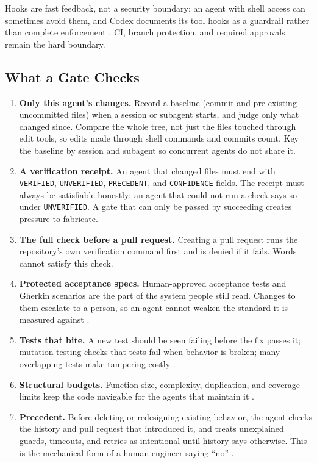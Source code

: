 \documentclass[11pt]{article}
\begin{document}
Hooks are fast feedback, not a security boundary: an agent with shell access can sometimes avoid them, and Codex documents its tool hooks as a guardrail rather than complete enforcement \cite{openai2026codexhooks}. CI, branch protection, and required approvals remain the hard boundary.

\subsection{What a Gate Checks}
\begin{enumerate}[leftmargin=*]
  \item \textbf{Only this agent's changes.} Record a baseline (commit and pre-existing uncommitted files) when a session or subagent starts, and judge only what changed since. Compare the whole tree, not just the files touched through edit tools, so edits made through shell commands and commits count. Key the baseline by session and subagent so concurrent agents do not share it.
  \item \textbf{A verification receipt.} An agent that changed files must end with \texttt{VERIFIED}, \texttt{UNVERIFIED}, \texttt{PRECEDENT}, and \texttt{CONFIDENCE} fields. The receipt must always be satisfiable honestly: an agent that could not run a check says so under \texttt{UNVERIFIED}. A gate that can only be passed by succeeding creates pressure to fabricate.
  \item \textbf{The full check before a pull request.} Creating a pull request runs the repository's own verification command first and is denied if it fails. Words cannot satisfy this check.
  \item \textbf{Protected acceptance specs.} Human-approved acceptance tests and Gherkin scenarios are the part of the system people still read. Changes to them escalate to a person, so an agent cannot weaken the standard it is measured against \cite{factory2026large}.
  \item \textbf{Tests that bite.} A new test should be seen failing before the fix passes it; mutation testing checks that tests fail when behavior is broken; many overlapping tests make tampering costly \cite{shihipar2026effort,padhye2026mutation,martin2026overload}.
  \item \textbf{Structural budgets.} Function size, complexity, duplication, and coverage limits keep the code navigable for the agents that maintain it \cite{martin2026messy}.
  \item \textbf{Precedent.} Before deleting or redesigning existing behavior, the agent checks the history and pull request that introduced it, and treats unexplained guards, timeouts, and retries as intentional until history says otherwise. This is the mechanical form of a human engineer saying ``no'' \cite{anthropic2026scion}.

\end{enumerate}
\end{document}
